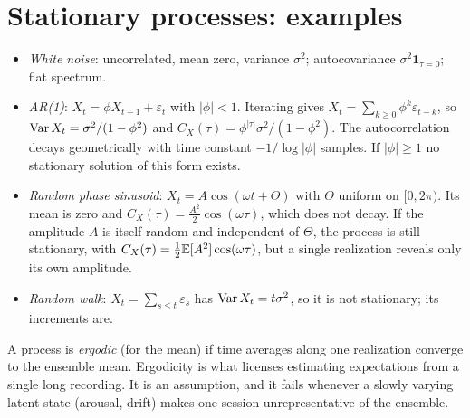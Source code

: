 \section{Stationary processes: examples}
\begin{itemize}[leftmargin=2em]
\item \emph{White noise}: uncorrelated, mean zero, variance $\sigma^2$; autocovariance $\sigma^2\mathbf 1_{\tau=0}$; flat spectrum.
\item \emph{AR(1)}: $X_t=\phi X_{t-1}+\varepsilon_t$ with $|\phi|<1$. Iterating gives $X_t=\sum_{k\ge0}\phi^k\varepsilon_{t-k}$, so $\operatorname{Var} X_t=\sigma^2/(1-\phi^2)$ and $C_X(\tau)=\phi^{|\tau|}\sigma^2/(1-\phi^2)$. The autocorrelation decays geometrically with time constant $-1/\log|\phi|$ samples. If $|\phi|\ge1$ no stationary solution of this form exists.
\item \emph{Random phase sinusoid}: $X_t=A\cos(\omega t+\Theta)$ with $\Theta$ uniform on $[0,2\pi)$. Its mean is zero and $C_X(\tau)=\tfrac{A^2}2\cos(\omega\tau)$, which does not decay. If the amplitude $A$ is itself random and independent of $\Theta$, the process is still stationary, with $C_X(\tau)=\tfrac12\mathbb E[A^2]\cos(\omega\tau)$, but a single realization reveals only its own amplitude.
\item \emph{Random walk}: $X_t=\sum_{s\le t}\varepsilon_s$ has $\operatorname{Var} X_t=t\sigma^2$, so it is not stationary; its increments are.
\end{itemize}
A process is \emph{ergodic} (for the mean) if time averages along one realization converge to the ensemble mean. Ergodicity is what licenses estimating expectations from a single long recording. It is an assumption, and it fails whenever a slowly varying latent state (arousal, drift) makes one session unrepresentative of the ensemble.

